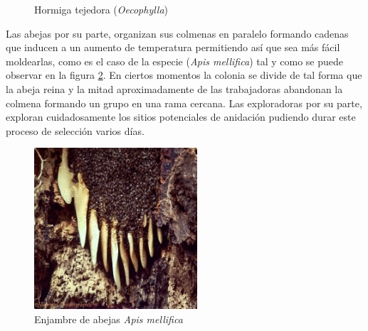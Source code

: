 \begin{figure}[!ht]
\centering
    \hspace{3cm}
\caption{Hormiga tejedora (\textit{Oecophylla})} 
\label{fig:Figura_HormigaTejedora}
\end{figure}

Las abejas por su parte, organizan sus colmenas en paralelo formando cadenas que inducen a un aumento de temperatura permitiendo así que sea más fácil moldearlas, como es el caso de la especie (\textit{Apis mellifica}) tal y como se puede observar en la figura \ref{fig:Figura_EnjambreAbeja}. En ciertos momentos la colonia se divide de tal forma que la abeja reina y la mitad aproximadamente de las trabajadoras abandonan la colmena formando un grupo en una rama cercana. Las exploradoras por su parte, exploran cuidadosamente los sitios potenciales de anidación pudiendo durar este proceso de selección varios días.

\begin{figure}[!ht]
\centering
    \includegraphics[height=6cm]{fig/cap02/Honey-Bee-comb.jpg}
    \caption{Enjambre de abejas \textit{Apis mellifica}}
    \label{fig:Figura_EnjambreAbeja}
\end{figure}


